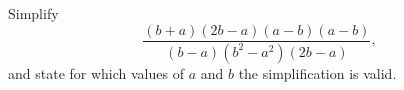 Simplify
\[\dfrac{(b+a)(2b-a)(a-b)(a-b)}{(b-a)\left(b^2-a^2\right)(2b-a)},\]
and state for which values of $a$ and $b$ the simplification is valid.

